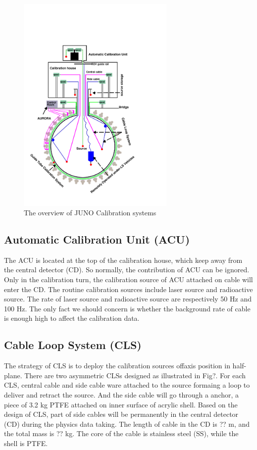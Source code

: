 \documentclass[review,number,sort&compress]{elsarticle}
\begin{document}
\begin{figure}[h]
	\centering
	\includegraphics[width=3in]{calib_systems.pdf}
	\caption{The overview of JUNO Calibration systems}
	\label{calib:systems}
\end{figure}

\subsection{Automatic Calibration Unit (ACU)}

The ACU is located at the top of the calibration house, which keep away from the central detector (CD).
So normally, the contribution of ACU can be ignored.
Only in the calibration turn, the calibration source of ACU attached on cable will enter the CD.
The routine calibration sources include laser source and radioactive source. The rate of laser source and radioactive source are respectively 50 Hz and 100 Hz. The only fact we should concern is whether the background rate of cable is enough high to affect the calibration data.


\subsection{Cable Loop System (CLS)}
The strategy of CLS is to deploy the calibration sources offaxis position in half-plane.
There are two asymmetric CLSs designed as illustrated in Fig?.
For each CLS, central cable and side cable ware attached to the source formaing a loop to deliver and retract the source.
And the side cable will go through a anchor, a piece of 3.2 kg PTFE attached on inner surface of acrylic shell.
Based on the design of CLS, part of side cables will be permanently in the central detector (CD) during the physics data taking. The length of cable in the CD is ?? m, and the total mass is ?? kg.
The core of the cable is stainless steel (SS), while the shell is PTFE.
\end{document}
